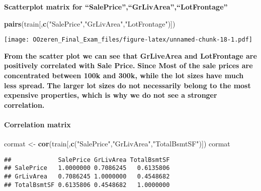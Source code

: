 \documentclass[]{article}
\newenvironment{Shaded}{\begin{snugshade}}{\end{snugshade}}
\newcommand{\KeywordTok}[1]{\textcolor[rgb]{0.13,0.29,0.53}{\textbf{#1}}}
\newcommand{\DataTypeTok}[1]{\textcolor[rgb]{0.13,0.29,0.53}{#1}}
\newcommand{\StringTok}[1]{\textcolor[rgb]{0.31,0.60,0.02}{#1}}
\newcommand{\CommentTok}[1]{\textcolor[rgb]{0.56,0.35,0.01}{\textit{#1}}}
\newcommand{\OtherTok}[1]{\textcolor[rgb]{0.56,0.35,0.01}{#1}}
\newcommand{\OperatorTok}[1]{\textcolor[rgb]{0.81,0.36,0.00}{\textbf{#1}}}
\newcommand{\NormalTok}[1]{#1}
\let\oldparagraph\paragraph
\renewcommand{\paragraph}[1]{\oldparagraph{#1}\mbox{}}
\begin{document}
\textbf{Scatterplot matrix for
``SalePrice'',``GrLivArea'',``LotFrontage''}

\begin{Shaded}
\begin{Highlighting}[]
\KeywordTok{pairs}\NormalTok{(train[,}\KeywordTok{c}\NormalTok{(}\StringTok{"SalePrice"}\NormalTok{,}\StringTok{"GrLivArea"}\NormalTok{,}\StringTok{"LotFrontage"}\NormalTok{)])}
\end{Highlighting}
\end{Shaded}

\texttt{[image: OOzeren\_Final\_Exam\_files/figure-latex/unnamed-chunk-18-1.pdf]}

\textbf{From the scatter plot we can see that GrLiveArea and LotFrontage
are positively correlated with Sale Price.} \textbf{Since Most of the
sale prices are concentrated between 100k and 300k, while the lot sizes
have much less spread.} \textbf{The larger lot sizes do not necessarily
belong to the most expensive properties, which is why we do not see a
stronger correlation.}

\paragraph{Correlation matrix}\label{correlation-matrix}

\begin{Shaded}
\begin{Highlighting}[]
\NormalTok{cormat <-}\StringTok{ }\KeywordTok{cor}\NormalTok{(train[,}\KeywordTok{c}\NormalTok{(}\StringTok{"SalePrice"}\NormalTok{,}\StringTok{"GrLivArea"}\NormalTok{,}\StringTok{"TotalBsmtSF"}\NormalTok{)])}
\NormalTok{cormat}
\end{Highlighting}
\end{Shaded}

\begin{verbatim}
##             SalePrice GrLivArea TotalBsmtSF
## SalePrice   1.0000000 0.7086245   0.6135806
## GrLivArea   0.7086245 1.0000000   0.4548682
## TotalBsmtSF 0.6135806 0.4548682   1.0000000
\end{verbatim}

\begin{Shaded}
\end{Shaded}
\end{document}
